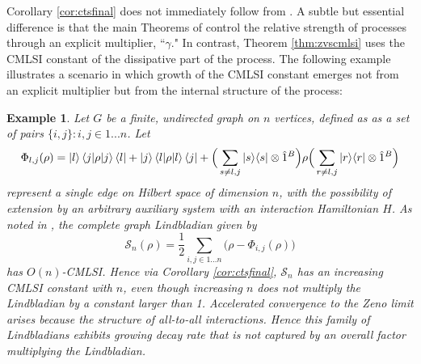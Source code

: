 \documentclass[accepted=2026-02-01, letterpaper]{quantumarticle}
\newcommand{\id}{\hat{1}}
\newtheorem{exam}[lemma]{Example}
\newcommand{\ketbra}[1]{|{#1}\rangle\langle{#1}|}
\renewcommand{\S}{\mathcal{S}}
\newcommand{\Ha}{H}
\begin{document}
Corollary \ref{cor:ctsfinal} does not immediately follow from \cite{burgarth_generalized_2019}. A subtle but essential difference is that the main Theorems of \cite{burgarth_generalized_2019} control the relative strength of processes through an explicit multiplier, ``$\gamma$." In contrast, Theorem \ref{thm:zvscmlsi} uses the CMLSI constant of the dissipative part of the process. The following example illustrates a scenario in which growth of the CMLSI constant emerges not from an explicit multiplier but from the internal structure of the process:
\begin{exam} \normalfont \label{ex:graphs}
Let $G$ be a finite, undirected graph on $n$ vertices, defined as as a set of pairs $\{i,j\} : i,j \in 1...n$. Let
\[ \Phi_{l,j}(\rho) = \ket{l}\braket{j | \rho | j} \bra{l} + \ket{j} \braket{l | \rho | l} \bra{j}
		+ \Big (\sum_{s \neq l,j} \ketbra{s} \otimes \id^B \Big ) \rho \Big (\sum_{r \neq l,j} \ketbra{r} \otimes \id^B \Big ) \]
represent a single edge on Hilbert space of dimension $n$, with the possibility of extension by an arbitrary auxiliary system with an interaction Hamiltonian $\Ha$. As noted in \cite{laracuente_quasi-factorization_2022}, the complete graph Lindbladian given by
\[ \S_n(\rho) = \frac{1}{2} \sum_{i, j \in 1...n} \Big ( \rho - \Phi_{i,j}(\rho) \Big ) \]
has $O(n)$-CMLSI. Hence via Corollary \ref{cor:ctsfinal}, $\S_n$ has an increasing CMLSI constant with $n$, even though increasing $n$ does not multiply the Lindbladian by a constant larger than 1. Accelerated convergence to the Zeno limit arises because the structure of all-to-all interactions. Hence this family of Lindbladians exhibits growing decay rate that is not captured by an overall factor multiplying the Lindbladian.
\end{exam}
\end{document}

